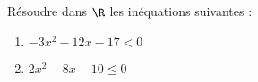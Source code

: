 \documentclass[a4paper,11pt,exos]{nsi} %
\begin{document}



\maketitle

\begin{exercice}
    Résoudre dans $\R$ les inéquations suivantes :
    \begin{multicols}{2}
        \begin{enumerate}
            \item $-3x^2-12x-17< 0$
	        \item $2x^2-8x-10\leq 0$
        \end{enumerate}
    \end{multicols}
    
\end{exercice}
\end{document}

